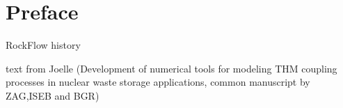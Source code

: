 \section{Preface}

RockFlow history

text from Joelle (Development of numerical tools for modeling THM
coupling processes in nuclear waste storage applications, common
manuscript by ZAG,ISEB and BGR)

